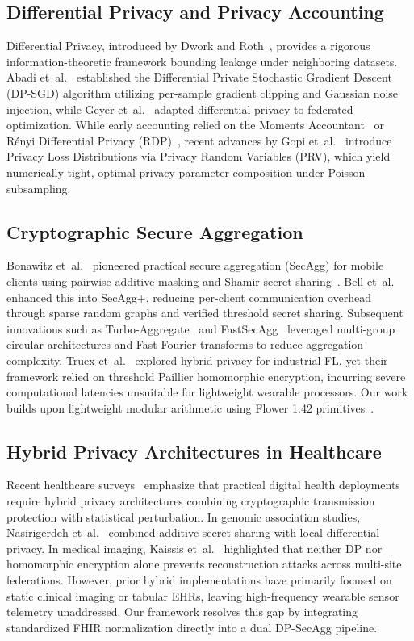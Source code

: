 \documentclass[journal,twocolumn,10pt]{IEEEtran}
\begin{document}
\subsection{Differential Privacy and Privacy Accounting}
Differential Privacy, introduced by Dwork and Roth~\cite{dwork2014algorithmic}, provides a rigorous information-theoretic framework bounding leakage under neighboring datasets. Abadi et~al.~\cite{abadi2016deep} established the Differential Private Stochastic Gradient Descent (DP-SGD) algorithm utilizing per-sample gradient clipping and Gaussian noise injection, while Geyer et~al.~\cite{geyer2017differentially} adapted differential privacy to federated optimization. While early accounting relied on the Moments Accountant~\cite{abadi2016deep} or R\'enyi Differential Privacy (RDP)~\cite{mironov2017renyi}, recent advances by Gopi et~al.~\cite{gopi2021numerical} introduce Privacy Loss Distributions via Privacy Random Variables (PRV), which yield numerically tight, optimal privacy parameter composition under Poisson subsampling.

\subsection{Cryptographic Secure Aggregation}
Bonawitz et~al.~\cite{bonawitz2017practical} pioneered practical secure aggregation (SecAgg) for mobile clients using pairwise additive masking and Shamir secret sharing~\cite{shamir1979share}. Bell et~al.~\cite{bell2020secaggplus} enhanced this into SecAgg+, reducing per-client communication overhead through sparse random graphs and verified threshold secret sharing. Subsequent innovations such as Turbo-Aggregate~\cite{so2021turbo} and FastSecAgg~\cite{kadhe2020fastsecagg} leveraged multi-group circular architectures and Fast Fourier transforms to reduce aggregation complexity. Truex et~al.~\cite{truex2019hybrid} explored hybrid privacy for industrial FL, yet their framework relied on threshold Paillier homomorphic encryption, incurring severe computational latencies unsuitable for lightweight wearable processors. Our work builds upon lightweight modular arithmetic using Flower 1.42 primitives~\cite{beaufays2020flower}.

\subsection{Hybrid Privacy Architectures in Healthcare}
Recent healthcare surveys~\cite{truxzkowski2021review, agrawal2022privacy} emphasize that practical digital health deployments require hybrid privacy architectures combining cryptographic transmission protection with statistical perturbation. In genomic association studies, Nasirigerdeh et~al.~\cite{nasirigerdeh2021splink} combined additive secret sharing with local differential privacy. In medical imaging, Kaissis et~al.~\cite{kaissis2020secure} highlighted that neither DP nor homomorphic encryption alone prevents reconstruction attacks across multi-site federations. However, prior hybrid implementations have primarily focused on static clinical imaging or tabular EHRs, leaving high-frequency wearable sensor telemetry unaddressed. Our framework resolves this gap by integrating standardized FHIR normalization directly into a dual DP-SecAgg pipeline.
\end{document}
